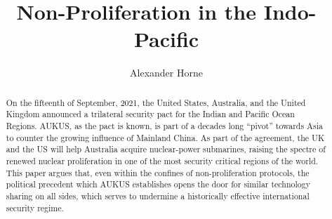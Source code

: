 \documentclass[letterpaper,12pt,twoside]{article} %
\title{\display Non-Proliferation in the Indo-Pacific}
\author{Alexander Horne}
\date{} %
\begin{document}
\begin{titlepage}
  \maketitle
\vfill

\renewcommand{\abstractname}{\sc\large Executive Summary}
\begin{abstract}

    On the fifteenth of September, 2021, the United States, Australia, and the United Kingdom announced a trilateral security pact for the Indian and Pacific Ocean Regions. AUKUS, as the pact is known, is part of a decades long ``pivot'' towards Asia to counter the growing influence of Mainland China. As part of the agreement, the UK and the US will help Australia acquire nuclear-power submarines, raising the spectre of renewed nuclear proliferation in one of the most security critical regions of the world. This paper argues that, even within the confines of non-proliferation protocols, the political precedent which AUKUS establishes opens the door for similar technology sharing on all sides, which serves to undermine a historically effective international security regime.

\end{abstract}

\end{titlepage}

{\hypersetup{hidelinks}
  \tableofcontents
}
  \vfill
  \pagebreak
\end{document}
